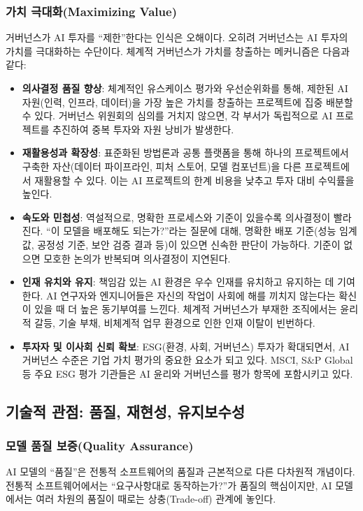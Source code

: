 \subsubsection*{가치 극대화(Maximizing Value)}
거버넌스가 AI 투자를 ``제한''한다는 인식은 오해이다. 오히려 거버넌스는 AI 투자의 가치를 극대화하는 수단이다.\cite{davenport2018advantage} 체계적 거버넌스가 가치를 창출하는 메커니즘은 다음과 같다:

\begin{itemize}
    \item \textbf{의사결정 품질 향상}: 체계적인 유스케이스 평가와 우선순위화를 통해, 제한된 AI 자원(인력, 인프라, 데이터)을 가장 높은 가치를 창출하는 프로젝트에 집중 배분할 수 있다. 거버넌스 위원회의 심의를 거치지 않으면, 각 부서가 독립적으로 AI 프로젝트를 추진하여 중복 투자와 자원 낭비가 발생한다.
    \item \textbf{재활용성과 확장성}: 표준화된 방법론과 공통 플랫폼을 통해 하나의 프로젝트에서 구축한 자산(데이터 파이프라인, 피처 스토어, 모델 컴포넌트)을 다른 프로젝트에서 재활용할 수 있다. 이는 AI 프로젝트의 한계 비용을 낮추고 투자 대비 수익률을 높인다.
    \item \textbf{속도와 민첩성}: 역설적으로, 명확한 프로세스와 기준이 있을수록 의사결정이 빨라진다. ``이 모델을 배포해도 되는가?''라는 질문에 대해, 명확한 배포 기준(성능 임계값, 공정성 기준, 보안 검증 결과 등)이 있으면 신속한 판단이 가능하다. 기준이 없으면 모호한 논의가 반복되며 의사결정이 지연된다.
    \item \textbf{인재 유치와 유지}: 책임감 있는 AI 환경은 우수 인재를 유치하고 유지하는 데 기여한다. AI 연구자와 엔지니어들은 자신의 작업이 사회에 해를 끼치지 않는다는 확신이 있을 때 더 높은 동기부여를 느낀다. 체계적 거버넌스가 부재한 조직에서는 윤리적 갈등, 기술 부채, 비체계적 업무 환경으로 인한 인재 이탈이 빈번하다.
    \item \textbf{투자자 및 이사회 신뢰 확보}: ESG(환경, 사회, 거버넌스) 투자가 확대되면서, AI 거버넌스 수준은 기업 가치 평가의 중요한 요소가 되고 있다. MSCI, S\&P Global 등 주요 ESG 평가 기관들은 AI 윤리와 거버넌스를 평가 항목에 포함시키고 있다.
\end{itemize}

\subsection{기술적 관점: 품질, 재현성, 유지보수성}
\subsubsection*{모델 품질 보증(Quality Assurance)}
AI 모델의 ``품질''은 전통적 소프트웨어의 품질과 근본적으로 다른 다차원적 개념이다.\cite{ashmore2021assuring} 전통적 소프트웨어에서는 ``요구사항대로 동작하는가?''가 품질의 핵심이지만, AI 모델에서는 여러 차원의 품질이 때로는 상충(Trade-off) 관계에 놓인다.

